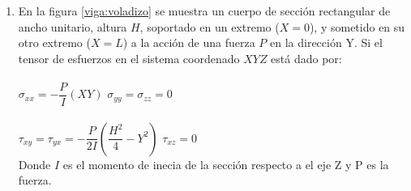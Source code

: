\documentclass[../notas medios.tex]{subfiles}
\begin{document}
\begin{enumerate}
\begin{enumerate}
		\item Aceptando como soluci\'on el tensor presentado en el numeral [1] y considerando que la presa est\'a construida con suelo compactado cuya resistencia ante esfuerzo cortante es de $ 0.5 \dfrac{kgf}{cm^2}$; si H = 3.0 m, c = 1.1 m, q = 1000 $\dfrac{kgf}{m^3}$ y p = 2000 $\dfrac{kgf}{m^3}$ se puede afirmar:
		\begin{enumerate} 
			\item La presa fallar\'ia ante esfuerzos de corte en el plano $xy$ porque el cortante en el punto de coordenadas (3.0 m,1.1 m) es mayor a 0.5 $\dfrac{kgf}{cm^3}$
			\item La presa fallar\'ia ante esfuerzos de corte en el plano $xy$ porque la magnitud del cortante m\'aximo en el punto de coordenadas (0.0 m,-1.1 m) es mayor a 0.5 $\dfrac{kgf}{cm^2}$. 
			\item La presa no fallar\'ia ante esfuerzos de corte en el plano $xy$ porque la magnitud del cortante m\'aximo en el punto de coordenadas (3.0 m,0.0 m) es menor a 0.5 $\dfrac{kgf}{cm^2}$. 
			\item La presa fallar\'ia ante esfuerzos de corte en el plano $xy$ porque la magnitud del cortante m\'aximo en el punto de coordenadas (3.0 m,-1.1 m) es mayor a 0.5 $\dfrac{kgf}{cm^2}$
		\end{enumerate}\	
	\end{enumerate}
\item \label{punto14} En la figura \ref{viga:voladizo} se muestra un cuerpo de
secci\'on rectangular de ancho unitario, altura $H$, soportado en un extremo ($X = 0$), y sometido en su otro extremo ($X = L$) a la acci\'on de una fuerza $P$ en la direcci\'on Y. Si el tensor de esfuerzos en el sistema coordenado $XYZ$ est\'a dado por:\\
\\
%
	$\sigma_{xx} = - \dfrac{P}{I} (XY)$ \hspace{40mm} $\sigma_{yy} = \sigma_{zz} = 0$ \\\\	
	$\tau_{xy} = \tau_{yx} = - \dfrac{P}{2I} (\dfrac{H^2}{4} - Y^2) $\hspace{20mm} $\tau_{xz} = 0$ \\	
%
Donde $I$ es el momento de inecia de la secci\'on respecto a el eje Z y P es la fuerza.
\begin{figure}[H]

\end{figure}
\end{enumerate}
\end{document}
